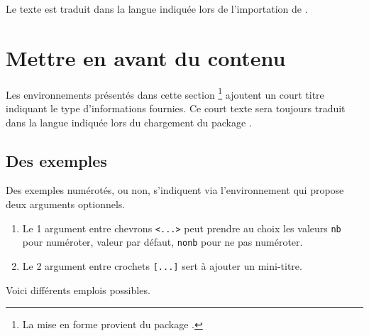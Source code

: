 \begin{bdocnote}
	Le texte  est traduit dans la langue indiquée lors de l'importation de .
\end{bdocnote}


\section{Mettre en avant du contenu}

\begin{bdocnote}
    Les environnements présentés dans cette section
    \footnote{
        La mise en forme provient du package .
    }
    ajoutent un court titre indiquant le type d'informations fournies.
    Ce court texte sera toujours traduit dans la langue indiquée lors du chargement du package .
\end{bdocnote}




\subsection{Des exemples}

Des exemples numérotés, ou non, s'indiquent via l'environnement  qui propose deux arguments optionnels.

\begin{enumerate}
    \item Le 1\ier{} argument entre chevrons \verb#<...># peut prendre au choix les valeurs \verb#nb# pour numéroter, valeur par défaut, \verb#nonb# pour ne pas numéroter.

    \item Le 2\ieme{} argument entre crochets \verb#[...]# sert à ajouter un mini-titre.
\end{enumerate}


Voici différents emplois possibles.








